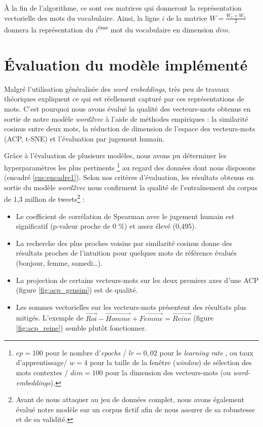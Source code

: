 \documentclass[10pt,french,french]{article}
\let\rmarkdownfootnote\footnote%
\def\footnote{\protect\rmarkdownfootnote}
\begin{document}
À la fin de l'algorithme, ce sont ces matrices qui donneront la
représentation vectorielle des mots du vocabulaire. Ainsi, la ligne
\(i\) de la matrice \(W=\frac{W_e+W_s}{2}\) donnera la représentation du
\(i\)\textsuperscript{ème} mot du vocabulaire en dimension \(dim\).

\newpage

\section{Évaluation du modèle implémenté}\label{sec:evaluation}

Malgré l'utilisation généralisée des \emph{word embeddings}, très peu de
travaux théoriques expliquent ce qui est réellement capturé par ces
représentations de mots. C'est pourquoi nous avons évalué la qualité des
vecteurs-mots obtenus en sortie de notre modèle \emph{word2vec} à l'aide
de méthodes empiriques : la similarité cosinus entre deux mots, la
réduction de dimension de l'espace des vecteurs-mots (ACP, t-SNE) et
l'évaluation par jugement humain.

Grâce à l'évaluation de plusieurs modèles, nous avons pu déterminer les
hyperparamètres les plus pertinents \footnote{
$ep = 100$ pour le nombre d'\og \emph{epochs} \fg / $lr = 0,02$ pour le \og \emph{learning rate} \fg, ou taux d'apprentissage/ $w = 4$ pour la taille de la fenêtre (\emph{window}) de sélection des mots contextes / $dim = 100$ pour la dimension des vecteurs-mots (ou \emph{word-embeddings}).
} au regard des données dont nous disposons (encadré
\ref{enc:encadre1}). Selon nos critères d'évaluation, les résultats
obtenus en sortie du modèle \emph{word2vec} nous confirment la qualité
de l'entraînement du corpus de 1,3 million de tweets\footnote{Avant de
  nous attaquer au jeu de données complet, nous avons également évalué
  notre modèle sur un corpus fictif afin de nous assurer de sa
  robustesse et de sa validité.} :

\begin{itemize}
\item Le coefficient de corrélation de Spearman avec le jugement humain est significatif (p-valeur proche de 0 \%) et assez élevé (0,495).
\item La recherche des plus proches voisins par similarité cosinus donne des résultats proches de l'intuition pour quelques mots de référence évalués (bonjour, femme, samedi\dots).
\item La projection de certains vecteurs-mots sur les deux premiers axes d'une ACP (figure \ref{fig:acp_gensim}) est de qualité.
\item Les sommes vectorielles sur les vecteurs-mots présentent des résultats plus mitigés. L'exemple de  $\overrightarrow{Roi} - \overrightarrow{Homme} + \overrightarrow{Femme} = \overrightarrow{Reine}$ (figure \ref{fig:acp_reine}) semble plutôt fonctionner. 
\end{itemize}
\end{document}
